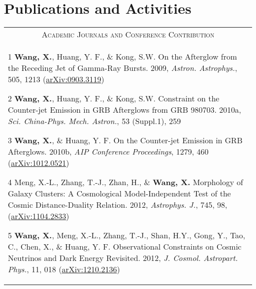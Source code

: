 \documentclass[10pt]{article}
\begin{document}
\section{Publications and Activities}
\begin{longtable}{p{17cm}}
\multicolumn{1}{c}{\textsc{Academic Journals and Conference Contribution}}      \\
\vspace{-0.3cm}
\begin{list}{}{\leftmargin=0.5em}
    \item[1]\hypertarget{1}{} \textbf{Wang, X.}, Huang, Y. F., \& Kong, S.W. On the Afterglow from the Receding Jet of Gamma-Ray Bursts. 2009, \textit{Astron. Astrophys.}, 505, 1213 (\href{http://arxiv.org/abs/0903.3119}{arXiv:0903.3119})
    \item[2]\hypertarget{2}{} \textbf{Wang, X.}, Huang, Y. F., \& Kong, S.W. Constraint on the Counter-jet Emission in GRB Afterglows from GRB 980703. 2010a, \textit{Sci. China-Phys. Mech. Astron.}, 53 (Suppl.1), 259
    \item[3]\hypertarget{3}{} \textbf{Wang, X.}, \& Huang, Y. F. On the Counter-jet Emission in GRB Afterglows. 2010b, \textit{AIP Conference Proceedings}, 1279, 460 (\href{http://arxiv.org/abs/1012.0521}{arXiv:1012.0521})
    \item[4]\hypertarget{4}{} Meng, X.-L., Zhang, T.-J., Zhan, H., \& \textbf{Wang, X.} Morphology of Galaxy Clusters: A Cosmological Model-Independent Test of the Cosmic Distance-Duality Relation. 2012, \textit{Astrophys. J.}, 745, 98, (\href{http://arxiv.org/abs/1104.2833}{arXiv:1104.2833})
    \item[5]\hypertarget{5}{} \textbf{Wang, X.}, Meng, X.-L., Zhang, T.-J., Shan, H.Y., Gong, Y., Tao, C., Chen, X., \& Huang, Y. F. Observational Constraints on Cosmic Neutrinos and Dark Energy Revisited. 2012, \textit{J. Cosmol. Astropart. Phys.}, 11, 018 (\href{http://arxiv.org/abs/1210.2136}{arXiv:1210.2136})
\end{list}  \\
\end{longtable}
\end{document}
